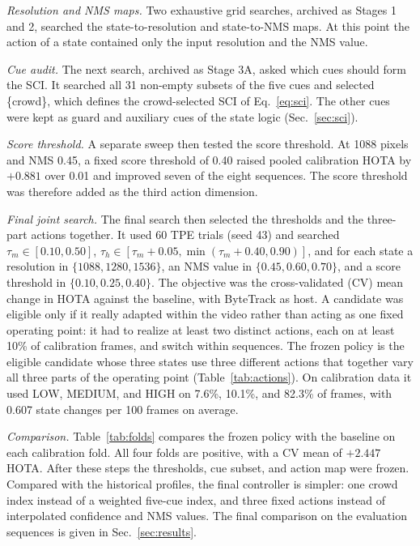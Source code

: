 \documentclass[journal]{new-aiaa}
\begin{document}
\emph{Resolution and NMS maps.} Two exhaustive grid searches, archived as
Stages 1 and 2, searched the state-to-resolution and state-to-NMS maps. At
this point the action of a state contained only the input resolution and the
NMS value.

\emph{Cue audit.} The next search, archived as Stage 3A, asked which cues
should form the SCI. It searched
all 31 non-empty subsets of the five cues and selected \{crowd\}, which defines
the crowd-selected SCI of Eq.~\eqref{eq:sci}. The other cues were kept as guard
and auxiliary cues of the state logic (Sec.~\ref{sec:sci}).

\emph{Score threshold.} A separate sweep then tested the score threshold. At
1088 pixels and NMS 0.45, a fixed score threshold of 0.40 raised pooled
calibration HOTA by $+0.881$ over 0.01 and improved seven of the eight
sequences. The score threshold was therefore added as the third action
dimension.

\emph{Final joint search.} The final search then selected the thresholds and
the three-part actions together. It used 60 TPE trials (seed 43) and searched
$\tau_m\in[0.10,0.50]$, $\tau_h\in[\tau_m+0.05,\min(\tau_m+0.40,0.90)]$,
and for each state a resolution in $\{1088,1280,1536\}$, an NMS value in
$\{0.45,0.60,0.70\}$, and a score threshold in $\{0.10,0.25,0.40\}$. The
objective was the cross-validated (CV) mean change in HOTA against the
baseline, with ByteTrack as host. A candidate was eligible only if it really adapted within the video
rather than acting as one fixed operating point: it had to realize at least
two distinct actions, each on at least 10\% of calibration frames, and switch
within sequences. The frozen policy is the eligible candidate whose three
states use three different actions that together vary all three parts of the
operating point (Table~\ref{tab:actions}). On calibration data it used LOW,
MEDIUM, and HIGH on 7.6\%, 10.1\%, and 82.3\% of frames, with 0.607 state
changes per 100 frames on average.

\emph{Comparison.} Table~\ref{tab:folds} compares the frozen policy with the
baseline on each calibration fold. All four folds are positive, with a CV
mean of $+2.447$ HOTA. After these steps the thresholds, cue subset, and
action map were frozen. Compared with the historical profiles, the final
controller is simpler: one crowd index instead of a weighted five-cue index,
and three fixed actions instead of interpolated confidence and NMS values. The final
comparison on the evaluation sequences is given in Sec.~\ref{sec:results}.
\end{document}
